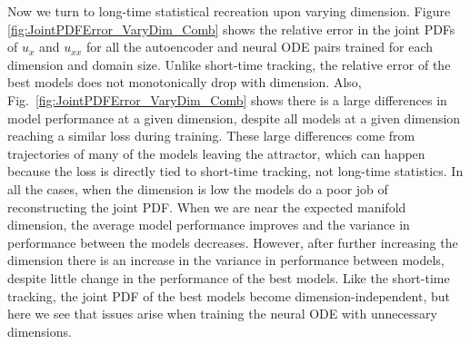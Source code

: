 \documentclass[preprint,aps,pre,letterpaper,onecolumn,superscriptaddress]{revtex4-2} %
\begin{document}



%

Now we turn to long-time statistical recreation upon varying dimension. Figure \ref{fig:JointPDFError_VaryDim_Comb} shows the relative error in the joint PDFs of $u_x$ and $u_{xx}$ for all the autoencoder and neural ODE pairs trained for each dimension and domain size. Unlike short-time tracking, the relative error of the best models does not monotonically drop with dimension. Also, Fig.\ \ref{fig:JointPDFError_VaryDim_Comb} shows there is a large differences in model performance at a given dimension, despite all models at a given dimension reaching a similar loss during training. These large differences come from trajectories of many of the models leaving the attractor, which can happen because the loss is directly tied to short-time tracking, not long-time statistics. 
In all the cases, when the dimension is low the models do a poor job of reconstructing the joint PDF. When we are near the expected manifold dimension, the average model performance improves and the variance in performance between the models decreases. However, after further increasing the dimension there is an increase in the variance in performance between models, despite little change in the performance of the best models. Like the short-time tracking, the joint PDF of the best models become dimension-independent, but here we see that issues arise when training the neural ODE with unnecessary dimensions.
\end{document}
